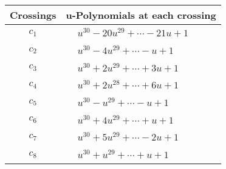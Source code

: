 \documentclass[1p]{elsarticle_modified}
\theoremstyle{definition}
\begin{document}
\begin{tabular}{m{50pt}|m{274pt}}
Crossings & \hspace{64pt}u-Polynomials at each crossing \\
\hline $$\begin{aligned}c_{1}\end{aligned}$$&$\begin{aligned}
&u^{30}-20 u^{29}+\cdots-21 u+1
\end{aligned}$\\
\hline $$\begin{aligned}c_{2}\end{aligned}$$&$\begin{aligned}
&u^{30}-4 u^{29}+\cdots- u+1
\end{aligned}$\\
\hline $$\begin{aligned}c_{3}\end{aligned}$$&$\begin{aligned}
&u^{30}+2 u^{29}+\cdots+3 u+1
\end{aligned}$\\
\hline $$\begin{aligned}c_{4}\end{aligned}$$&$\begin{aligned}
&u^{30}+2 u^{28}+\cdots+6 u+1
\end{aligned}$\\
\hline $$\begin{aligned}c_{5}\end{aligned}$$&$\begin{aligned}
&u^{30}- u^{29}+\cdots- u+1
\end{aligned}$\\
\hline $$\begin{aligned}c_{6}\end{aligned}$$&$\begin{aligned}
&u^{30}+4 u^{29}+\cdots+u+1
\end{aligned}$\\
\hline $$\begin{aligned}c_{7}\end{aligned}$$&$\begin{aligned}
&u^{30}+5 u^{29}+\cdots-2 u+1
\end{aligned}$\\
\hline $$\begin{aligned}c_{8}\end{aligned}$$&$\begin{aligned}
&u^{30}+u^{29}+\cdots+u+1
\end{aligned}$\\

\end{tabular}
\end{document}
